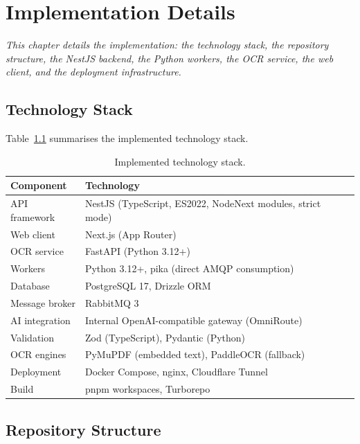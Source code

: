 \chapter{Implementation Details}
\label{ch:implementation}

\begin{center}
\textit{This chapter details the implementation: the technology stack, the
repository structure, the NestJS backend, the Python workers, the OCR service,
the web client, and the deployment infrastructure.}
\end{center}

\vspace*{\fill}
\clearpage
\section{Technology Stack}

\noindent Table~\ref{tab:stack} summarises the implemented technology stack.

\begin{table}[htbp]
\centering
\small
\begin{tabular}{@{}p{4.3cm}p{10.2cm}@{}}
\toprule
\textbf{Component} & \textbf{Technology} \\
\midrule
API framework & NestJS (TypeScript, ES2022, NodeNext modules, strict mode) \\
Web client & Next.js (App Router) \\
OCR service & FastAPI (Python 3.12+) \\
Workers & Python 3.12+, pika (direct AMQP consumption) \\
Database & PostgreSQL 17, Drizzle ORM \\
Message broker & RabbitMQ 3 \\
AI integration & Internal OpenAI-compatible gateway (OmniRoute) \\
Validation & Zod (TypeScript), Pydantic (Python) \\
OCR engines & PyMuPDF (embedded text), PaddleOCR (fallback) \\
Deployment & Docker Compose, nginx, Cloudflare Tunnel \\
Build & pnpm workspaces, Turborepo \\
\bottomrule
\end{tabular}
\caption{Implemented technology stack.}
\label{tab:stack}
\end{table}

\section{Repository Structure}

